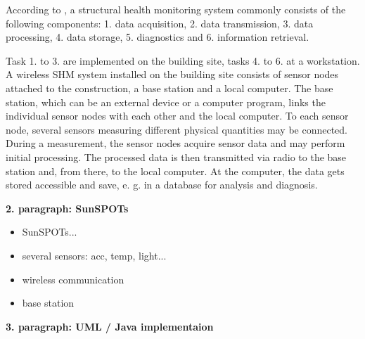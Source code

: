 \documentclass[12pt]{scrartcl}
\begin{document}
According to \cite[5]{BisbySHM}, a structural health monitoring system commonly consists of the following components:
1. data acquisition,
2. data transmission, 
3. data processing,
4. data storage,
5. diagnostics and 
6. information retrieval.

Task 1. to 3. are implemented on the building site, tasks 4. to 6. at a workstation. 
A wireless SHM system installed on the building site consists of sensor nodes attached to the construction, a base station and a local computer. 
The base station, which can be an external device or a computer program, links the individual sensor nodes with each other and the local computer.
To each sensor node, several sensors measuring different physical quantities may be connected. 
During a measurement, the sensor nodes acquire sensor data and may perform initial processing.
The processed data is then transmitted via radio to the base station and, from there, to the local computer. 
At the computer, the data gets stored accessible and save, e. g. in a database for analysis and diagnosis.



\textbf{2. paragraph: SunSPOTs}

\begin{itemize}
\item SunSPOTs...
\item several sensors: acc, temp, light...
\item wireless communication
\item base station
\end{itemize}



\textbf{3. paragraph: UML / Java implementaion}
\end{document}
